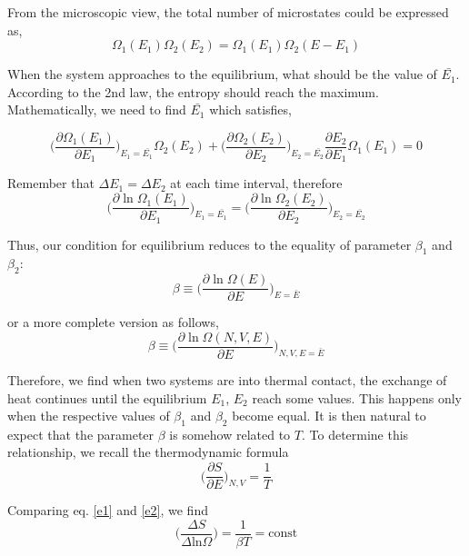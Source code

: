 From the microscopic view,  the total number of microstates could be expressed as,
\begin{equation} \Omega_1(E_1)\Omega_2(E_2) = \Omega_1(E_1) \Omega_2(E-E_1)  \end{equation}

When the system approaches to the equilibrium, what should be the value of $\bar{E_1}$. 
According to the 2nd law, the entropy should reach the maximum. Mathematically, we need to find $\bar{E_1}$ which satisfies,

\begin{equation} 
	\bigg(\frac{\partial {\Omega_1(E_1)}} {\partial {E_1}}\bigg) _{E_1=\bar{E_1}} \Omega_2(E_2) + 
	\bigg(\frac{\partial {\Omega_2(E_2)}} {\partial {E_2}}\bigg) _{E_2=\bar{E_2}} \frac{\partial{E_2}}{\partial{E_1}}\Omega_1(E_1) = 0 
\end{equation}

Remember that $\Delta E_1 = \Delta E_2$ at each time interval, therefore
\begin{equation} 
	\bigg(\frac{\partial {\ln \Omega_1(E_1)}} {\partial {E_1}}\bigg) _{E_1=\bar{E_1}} =
	\bigg(\frac{\partial {\ln \Omega_2(E_2)}} {\partial {E_2}}\bigg) _{E_2=\bar{E_2}}
\end{equation}

Thus, our condition for equilibrium reduces to the equality of parameter $\beta_1$ and $\beta_2$:
\begin{equation} 
	\beta \equiv \bigg(\frac{\partial {\ln \Omega(E)}} {\partial {E}}\bigg) _{E=\bar{E}}
\end{equation}

or a more complete version as follows,
\begin{equation} \label{e1}
	\beta \equiv \bigg(\frac{\partial {\ln \Omega(N,V,E)}} {\partial {E}}\bigg) _{N,V,E=\bar{E}}
\end{equation}

Therefore, we find when two systems are into thermal contact, the exchange of heat continues until the equilibrium $E_1$, $E_2$ reach some values.
This happens only when the respective values of $\beta_1$ and $\beta_2$ become equal. It is then natural to expect that the parameter $\beta$ is somehow related to $T$. To determine this relationship, we recall the thermodynamic formula
\begin{equation} \label{e2}
	\bigg(\frac{\partial S}{\partial E}\bigg)_{N,V} = \frac{1}{T}
\end{equation}

Comparing eq. \ref{e1} and \ref{e2}, we find
\begin{equation} 
	\bigg(\frac{\Delta S}{\Delta \textrm{ln} \Omega} \bigg) = \frac{1}{\beta T} = \textrm{const}
\end{equation}

